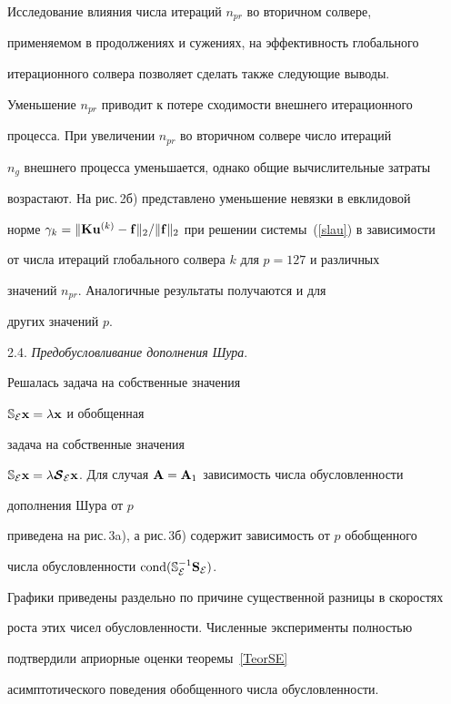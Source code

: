 Исследование влияния числа итераций $n_{pr}$ во вторичном солвере,


применяемом в продолжениях и сужениях, на эффективность глобального 


итерационного солвера позволяет сделать также следующие выводы. 


Уменьшение $n_{pr}$ приводит к потере сходимости внешнего итерационного 


процесса. При увеличении $n_{pr}$ во вторичном солвере число итераций 


$n_g$ внешнего процесса уменьшается, однако общие вычислительные затраты 


возрастают. На рис.\,2б) представлено уменьшение невязки в евклидовой 


норме $\gamma_k = \| {\bold K}{\bold u}^{(k)} -{\bold f}


\|_2/ \|{\bold f} \|_2$ при решении системы~(\ref{slau}) в зависимости 


от числа итераций глобального солвера $k$ для $p=127$ и различных 


значений $n_{pr}$. Аналогичные результаты получаются и для


других значений $p$.


\medskip





2.4. {\it Предобусловливание дополнения Шура}.


Решалась задача на собственные значения 


$\Bbb{S}_{\cal E} \bold x=\lambda \bold x$ и обобщенная


задача на собственные значения 


$\Bbb{S}_{\cal E}\bold x=\lambda\bi{\cal S}_{\cal E} \bold


x$. Для случая ${\bold A}={\bold A}_1$ зависимость числа обусловленности 


дополнения Шура от $p$ 


приведена на рис.\,3a), а рис.\,3б) содержит зависимость от $p$ обобщенного


числа обусловленности $\operatorname{cond}(\Bbb{S}_{\cal E}^{-1}{\bold S}_{\cal E})$. 


Графики приведены раздельно по причине существенной разницы в скоростях 


роста этих чисел обусловленности. Численные эксперименты полностью 


подтвердили априорные оценки теоремы~\ref{TeorSE}


асимптотического поведения обобщенного числа обусловленности.


